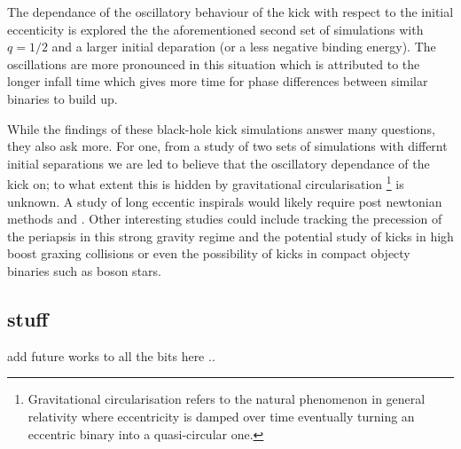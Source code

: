 The dependance of the oscillatory behaviour of the kick with respect to the initial
eccenticity is explored the the aforementioned second set of simulations with
$q=1/2$ and a larger initial deparation (or a less negative binding energy). The
oscillations are more pronounced in this situation which is attributed to the longer
infall time which gives more time for phase differences between similar binaries to
build up.

While the findings of these black-hole kick simulations answer many questions, they
also ask more. For one, from a study of two sets of simulations with differnt
initial separations we are led to believe
that the oscillatory dependance of the kick on; to what extent this is hidden by
gravitational circularisation
\footnote{Gravitational circularisation refers to the natural phenomenon in general
relativity where eccentricity is damped over time eventually turning an eccentric
binary into a quasi-circular one.}
is unknown. A study of long eccentic inspirals would likely require post newtonian
methods and . Other interesting studies could include tracking the precession of
the periapsis in this strong gravity regime and the potential study of kicks in
high boost graxing collisions or even the possibility of kicks in compact objecty
binaries such as boson stars.

\subsection{stuff}
add future works to all the bits here ..
